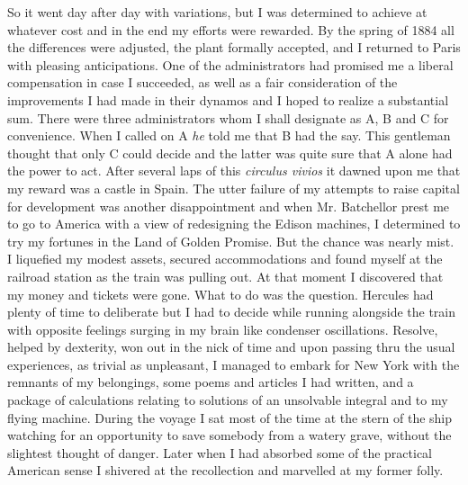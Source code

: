 \documentclass[a4paper,12pt,english,twoside,openright]{memoir}
\begin{document}
So it went day after day with variations, but I was determined to achieve at whatever cost and in 
the end my efforts were rewarded.  By the spring of 1884 all the differences were adjusted, the 
plant formally accepted, and I returned to Paris with pleasing anticipations.  One of the 
administrators had promised me a liberal compensation in case I succeeded, as well as a fair 
consideration of the improvements I had made in their dynamos and I hoped to realize a 
substantial sum.  There were three administrators whom I shall designate as A, B and C for 
convenience.  When I called on A \emph{he} told me that B had the say.  This gentleman thought that 
only C could decide and the latter was quite sure that A alone had the power to act.  After several 
laps of this \emph{circulus vivios} it dawned upon me that my reward was a castle in Spain.  The utter 
failure of my attempts to raise capital for development was another disappointment
and when Mr. 
Batchellor prest me to go to America with a view of redesigning the Edison machines, I 
determined to try my fortunes in the Land of Golden Promise.  But the chance was nearly mist.  I 
liquefied my modest assets, secured accommodations and found myself at the railroad station as 
the train was pulling out.  At that moment I discovered that my money and tickets were gone.  
What to do was the question.  Hercules had plenty of time to deliberate but I had to decide while 
running alongside the train with opposite feelings surging in my brain like condenser oscillations.  
Resolve, helped by dexterity, won out in the nick of time and upon passing thru the usual 
experiences, as trivial as unpleasant, I managed to embark for New York with the remnants of my 
belongings, some poems and articles I had written, and a package of calculations relating to 
solutions of an unsolvable integral and to my flying machine.  During the voyage I sat most of the 
time at the stern of the ship watching for an opportunity to save somebody from a watery grave, 
without the slightest thought of danger.  Later when I had absorbed some of the practical 
American sense I shivered at the recollection and marvelled at my former folly.  

\vspace{-1em}
\end{document}
